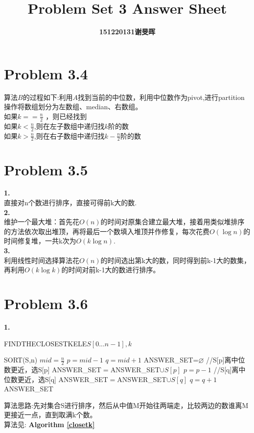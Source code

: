 \documentclass[twocolumn]{ctexart}
\begin{document}
	\title{Problem Set 3 Answer Sheet}
	\author{\textbf{151220131谢旻晖}}
	\date{}
	\maketitle
	
\section*{Problem 3.4}
\indent 算法$B$的过程如下:利用$A$找到当前的中位数，利用中位数作为pivot,进行partition操作将数组划分为左数组、median、右数组。\\
\indent 如果$k==\frac{n}{2}$	，则已经找到\\
\indent 如果$k<\frac{n}{2}$,则在左子数组中递归找$k$阶的数\\
\indent 如果$k>\frac{n}{2}$,则在右子数组中递归找$k-\frac{n}{2}$阶的数

\section*{Problem 3.5}
\noindent \textbf{1.}\\
\indent 直接对n个数进行排序，直接可得前k大的数.\\


\noindent \textbf{2.}\\
\indent 维护一个最大堆：首先花$O(n)$的时间对原集合建立最大堆，接着用类似堆排序的方法依次取出堆顶，再将最后一个数填入堆顶并作修复，每次花费$O(\log{n})$的时间修复堆，一共k次为$O(k\log{n})$.\\

\noindent \textbf{3.}\\
\indent 利用线性时间选择算法花$O(n)$的时间选出第k大的数，同时得到前k-1大的数集，再利用$O(k\log{k})$的时间对前k-1大的数进行排序。\\



\section*{Problem 3.6}
\noindent \textbf{1.}\\
\begin{algorithm}[htbp]
	\caption{FINDTHECLOSESTKELE$S[0...n-1],k$}
	\label{closetk}
	\begin{algorithmic}[1]
		\STATE SORT(S,n)
		\STATE $mid=\frac{n}{2}$
		\STATE $p=mid-1$
		\STATE $q=mid+1$
		\STATE ANSWER\_SET=$\varnothing$
		\STATE //S[p]离中位数更近，选S[p]
		\STATE ANSWER\_SET$=$ANSWER\_SET$\cup{S[p]}$
		\STATE $p=p-1$
		\ELSE
		\STATE //S[q]离中位数更近，选S[q]
		\STATE ANSWER\_SET$=$ANSWER\_SET$\cup{S[q]}$
		\STATE $q=q+1$
		\ENDIF
		\RETURN ANSWER\_SET
		\ENDWHILE
	\end{algorithmic}
\end{algorithm}
\indent 算法思路:先对集合S进行排序，然后从中值M开始往两端走，比较两边的数谁离M更接近一点，直到取满k个数。\\
算法见: \textbf{Algorithm \ref{closetk}}
\end{document}
